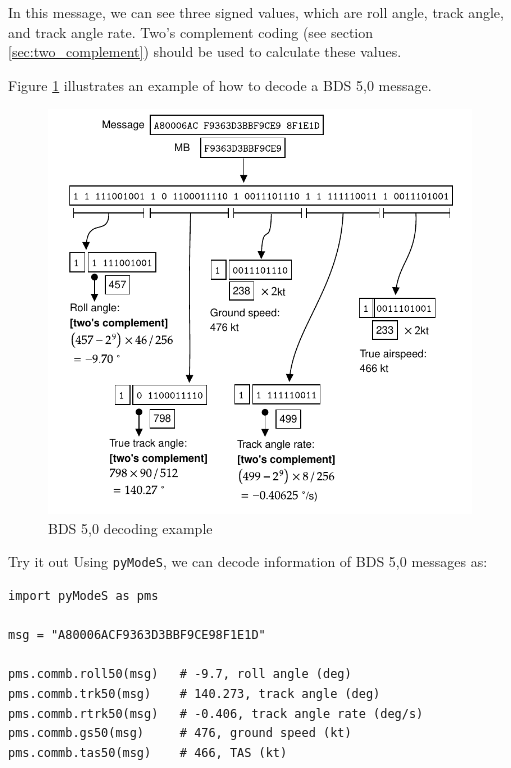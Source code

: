 In this message, we can see three signed values, which are roll angle, track angle, and track angle rate. Two's complement coding (see section \ref{sec:two_complement}) should be used to calculate these values.

Figure \ref{fig:bds50_example} illustrates an example of how to decode a BDS 5,0 message.

\begin{figure}[ht]
  \centering
  \includegraphics[scale=0.9]{figures/mode_s/bds50_example.pdf}
  \caption{BDS 5,0 decoding example}
  \label{fig:bds50_example}
\end{figure}

\begin{notebox}{Try it out}
Using \texttt{pyModeS}, we can decode information of BDS 5,0 messages as: 

\begin{verbatim}
import pyModeS as pms

msg = "A80006ACF9363D3BBF9CE98F1E1D"

pms.commb.roll50(msg)   # -9.7, roll angle (deg)
pms.commb.trk50(msg)    # 140.273, track angle (deg)
pms.commb.rtrk50(msg)   # -0.406, track angle rate (deg/s)
pms.commb.gs50(msg)     # 476, ground speed (kt)
pms.commb.tas50(msg)    # 466, TAS (kt)

\end{verbatim}

\end{notebox}


